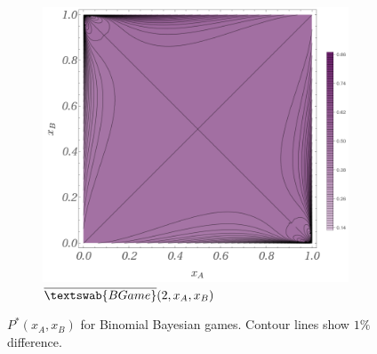 \documentclass{article}
\theoremstyle{definition}
\newcommand{\InfBG}[1]{$\overline{\textswab{BGame}}(#1)$}
\begin{document}
\begin{figure}[H]
\begin{subfigure}[b]{0.4\textwidth}
        \includegraphics[width=\textwidth]{img/BinomialBayesian_2.png}
        \caption{\InfBG{2,x_A,x_B}}
        \label{fig:PBG_2}
    \end{subfigure}
    
    \caption{$P^*(x_A,x_B)$ for Binomial Bayesian games. Contour lines show $1\%$ difference.}
    \label{fig:P_InfBG_1_2}
\end{figure}
\end{document}
